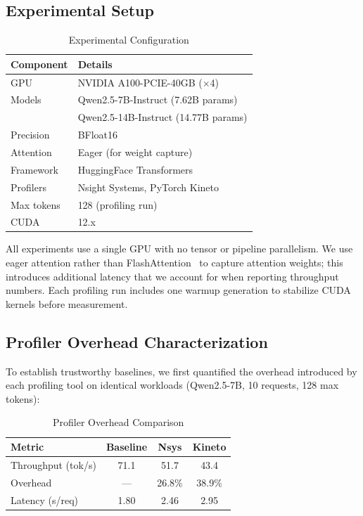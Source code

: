 \documentclass[conference]{IEEEtran}
\begin{document}
\subsection{Experimental Setup}

\begin{table}[h]
\centering
\caption{Experimental Configuration}
\label{tab:setup}
\begin{tabular}{@{}ll@{}}
\toprule
\textbf{Component} & \textbf{Details} \\
\midrule
GPU & NVIDIA A100-PCIE-40GB ($\times$4) \\
Models & Qwen2.5-7B-Instruct (7.62B params) \\
 & Qwen2.5-14B-Instruct (14.77B params) \\
Precision & BFloat16 \\
Attention & Eager (for weight capture) \\
Framework & HuggingFace Transformers \\
Profilers & Nsight Systems, PyTorch Kineto \\
Max tokens & 128 (profiling run) \\
CUDA & 12.x \\
\bottomrule
\end{tabular}
\end{table}

All experiments use a single GPU with no tensor or pipeline parallelism. We use eager attention rather than FlashAttention~\cite{flashattn} to capture attention weights; this introduces additional latency that we account for when reporting throughput numbers. Each profiling run includes one warmup generation to stabilize CUDA kernels before measurement.

\subsection{Profiler Overhead Characterization}

To establish trustworthy baselines, we first quantified the overhead introduced by each profiling tool on identical workloads (Qwen2.5-7B, 10 requests, 128 max tokens):

\begin{table}[h]
\centering
\caption{Profiler Overhead Comparison}
\label{tab:overhead}
\begin{tabular}{@{}lccc@{}}
\toprule
\textbf{Metric} & \textbf{Baseline} & \textbf{Nsys} & \textbf{Kineto} \\
\midrule
Throughput (tok/s) & 71.1 & 51.7 & 43.4 \\
Overhead & --- & 26.8\% & 38.9\% \\
Latency (s/req) & 1.80 & 2.46 & 2.95 \\
\bottomrule
\end{tabular}
\end{table}
\end{document}
